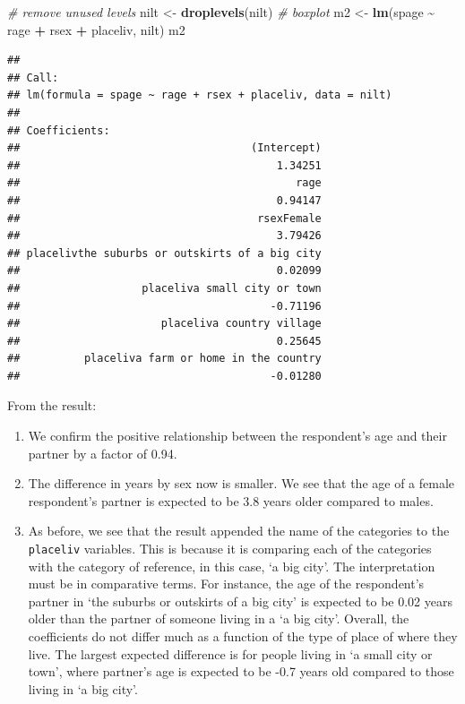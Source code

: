\documentclass[
]{book}
\newenvironment{Shaded}{\begin{snugshade}}{\end{snugshade}}
\newcommand{\CommentTok}[1]{\textcolor[rgb]{0.56,0.35,0.01}{\textit{#1}}}
\newcommand{\FunctionTok}[1]{\textcolor[rgb]{0.13,0.29,0.53}{\textbf{#1}}}
\newcommand{\NormalTok}[1]{#1}
\newcommand{\OtherTok}[1]{\textcolor[rgb]{0.56,0.35,0.01}{#1}}
\newcommand{\SpecialCharTok}[1]{\textcolor[rgb]{0.81,0.36,0.00}{\textbf{#1}}}
\providecommand{\tightlist}{%
  \setlength{\itemsep}{0pt}\setlength{\parskip}{0pt}}
\begin{document}
\begin{Shaded}
\begin{Highlighting}[]
\CommentTok{\# remove unused levels}
\NormalTok{nilt }\OtherTok{\textless{}{-}} \FunctionTok{droplevels}\NormalTok{(nilt)}
\CommentTok{\# boxplot}
\NormalTok{m2 }\OtherTok{\textless{}{-}} \FunctionTok{lm}\NormalTok{(spage }\SpecialCharTok{\textasciitilde{}}\NormalTok{ rage }\SpecialCharTok{+}\NormalTok{ rsex }\SpecialCharTok{+}\NormalTok{ placeliv, nilt)}
\NormalTok{m2}
\end{Highlighting}
\end{Shaded}

\begin{verbatim}
## 
## Call:
## lm(formula = spage ~ rage + rsex + placeliv, data = nilt)
## 
## Coefficients:
##                                    (Intercept)  
##                                        1.34251  
##                                           rage  
##                                        0.94147  
##                                     rsexFemale  
##                                        3.79426  
## placelivthe suburbs or outskirts of a big city  
##                                        0.02099  
##                   placeliva small city or town  
##                                       -0.71196  
##                      placeliva country village  
##                                        0.25645  
##          placeliva farm or home in the country  
##                                       -0.01280
\end{verbatim}

From the result:

\begin{enumerate}
\def\labelenumi{\arabic{enumi}.}
\tightlist
\item
  We confirm the positive relationship between the respondent's age and their partner by a factor of 0.94.
\item
  The difference in years by sex now is smaller. We see that the age of a female respondent's partner is expected to be 3.8 years older compared to males.
\item
  As before, we see that the result appended the name of the categories to the \texttt{placeliv} variables. This is because it is comparing each of the categories with the category of reference, in this case, `a big city'. The interpretation must be in comparative terms. For instance, the age of the respondent's partner in `the suburbs or outskirts of a big city' is expected to be 0.02 years older than the partner of someone living in a `a big city'. Overall, the coefficients do not differ much as a function of the type of place of where they live. The largest expected difference is for people living in `a small city or town', where partner's age is expected to be -0.7 years old compared to those living in `a big city'.
\end{enumerate}
\end{document}
